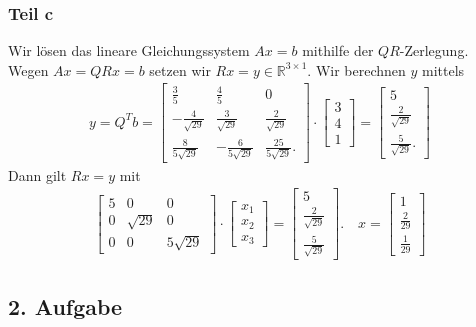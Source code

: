 \documentclass[fleqn,draft,a5paper]{article}
\theoremstyle{remark}
\begin{document}
  \subsubsection{Teil c}
  Wir lösen das lineare Gleichungssystem \(A x = b\) mithilfe der
  \(QR\)-Zerlegung.
  Wegen \(A x = QRx = b\) setzen wir \(Rx = y \in \mathbb{R}^{3 \times 1}\).  Wir
  berechnen \(y\) mittels
  \begin{align*}
     y = Q^{T} b =  \begin{bmatrix}
      \frac35 & \frac45 & 0 \\
      -\frac{4}{\sqrt{29}} & \frac{3}{\sqrt{29}} & \frac{2}{\sqrt{29}}
      \\
      \frac{8}{5\sqrt{29}} & -\frac{6}{5\sqrt{29}} & \frac{25}{5\sqrt{29}}.
    \end{bmatrix} \cdot
    \begin{bmatrix}
      3 \\ 4 \\ 1
    \end{bmatrix}
    =
    \begin{bmatrix}
      5 \\ \frac{2}{\sqrt{29}} \\ \frac{5}{\sqrt{29}}.
    \end{bmatrix}
  \end{align*}
  Dann gilt \(R x = y \) mit
  \begin{align*}
    \begin{bmatrix}
      5 & 0 & 0 \\ 0 & \sqrt{29} & 0 \\ 0 & 0& 5\sqrt{29}
    \end{bmatrix}\cdot
    \begin{bmatrix}
      x_{1} \\ x_{2} \\ x_{3}
    \end{bmatrix} =
    \begin{bmatrix}
      5  \\ \frac{2}{\sqrt{29}} \\ \frac{5}{\sqrt{29}}
    \end{bmatrix}. \quad
        x =
    \begin{bmatrix}
      1 \\ \frac{2}{29} \\ \frac{1}{29}
    \end{bmatrix}
  \end{align*}
  \subsection{2. Aufgabe}
\end{document}
